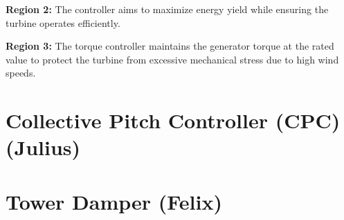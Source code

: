\textbf{Region 2:} The controller aims to maximize energy yield while ensuring the turbine operates efficiently.

\textbf{Region 3:} The torque controller maintains the generator torque at the rated value to protect the turbine from excessive mechanical stress due to high wind speeds.

\section{Collective Pitch Controller (CPC) (Julius)}


\section{Tower Damper (Felix)}